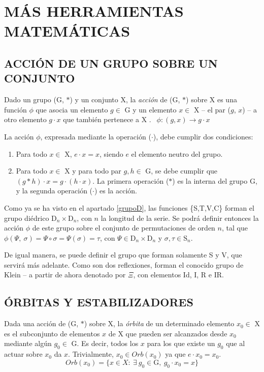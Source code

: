 	\chapter{MÁS HERRAMIENTAS MATEMÁTICAS}	
	\section{ACCIÓN DE UN GRUPO SOBRE UN CONJUNTO}
		Dado un grupo (G, $*$) y un conjunto X, la \emph{acción} de (G, $*$) sobre X es una función $\phi$ que asocia un elemento $g \in$ G y un elemento $x \in$ X -- el par ($g$, $x$) -- a otro elemento $g\cdot x$ que también pertenece a X \cite{armstrong}. $\ \ \phi :(g,x) \to g\cdot x$
	
		La acción $\phi$, expresada mediante la operación ($\cdot$), debe cumplir dos condiciones:
		\begin{enumerate}
			\item{Para todo $x\in$ X, $e\cdot x=x$, siendo $e$ el elemento neutro del grupo.}
		
			\item{Para todo $x\in$ X y para todo par $g,h\in$ G, se debe cumplir que $(g*h)\cdot x=g\cdot (h\cdot x)$. La primera operación ($*$) es la interna del grupo G, y la segunda operación ($\cdot$) es la acción.}
		\end{enumerate}
		Como ya se ha visto en el apartado \ref{grupoD}, las funciones \{S,T,V,C\} forman el grupo diédrico $\text{D}_{n}\times\text{D}_{n}$, con $n$ la longitud de la serie. Se podrá definir entonces la acción $\phi$ de este grupo sobre el conjunto de permutaciones de orden $n$, tal que $\phi(\Psi,\ \sigma)=\Psi\circ\sigma=\Psi(\sigma)=\tau$, con $\Psi\in\text{D}_{n}\times\text{D}_{n}$ y $\sigma,\tau\in\text{S}_n$.
		
		De igual manera, se puede definir el grupo que forman solamente S y V, que servirá más adelante. Como son dos reflexiones, forman el conocido grupo de Klein -- a partir de ahora denotado por $\Xi$, con elementos Id, I, R e IR.

	\section{ÓRBITAS Y ESTABILIZADORES}	
		Dada una acción de (G, $*$) sobre X, la \emph{órbita} de un determinado elemento $x_0\in$ X es el subconjunto de elementos $x$ de X que pueden ser alcanzados desde $x_0$ mediante algún $g_0\in$ G. Es decir, todos los $x$ para los que existe un $g_0$ que al actuar sobre $x_0$ da $x$. Trivialmente, $x_0\in Orb(x_0)$ ya que $e\cdot x_0=x_0$.
		$$Orb(x_0)=\{x\in X :\ \exists \ g_0\in \text{G},\ g_0\cdot x_0 =x\}$$
	
